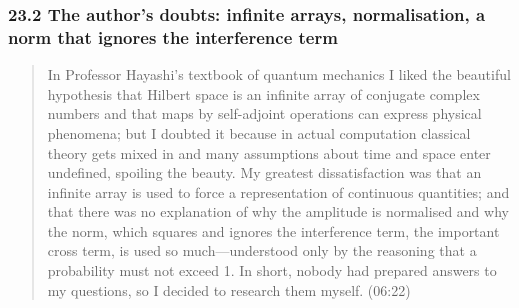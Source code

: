 \documentclass[
  a4paper,
]{article}
\begin{document}
\subsubsection{23.2 The author's doubts: infinite arrays, normalisation,
a norm that ignores the interference
term}\label{the-authors-doubts-infinite-arrays-normalisation-a-norm-that-ignores-the-interference-term}

\begin{quote}
In Professor Hayashi's textbook of quantum mechanics I liked the
beautiful hypothesis that Hilbert space is an infinite array of
conjugate complex numbers and that maps by self-adjoint operations can
express physical phenomena; but I doubted it because in actual
computation classical theory gets mixed in and many assumptions about
time and space enter undefined, spoiling the beauty. My greatest
dissatisfaction was that an infinite array is used to force a
representation of continuous quantities; and that there was no
explanation of why the amplitude is normalised and why the norm, which
squares and ignores the interference term, the important cross term, is
used so much---understood only by the reasoning that a probability must
not exceed 1. In short, nobody had prepared answers to my questions, so
I decided to research them myself. (06:22)
\end{quote}
\end{document}
